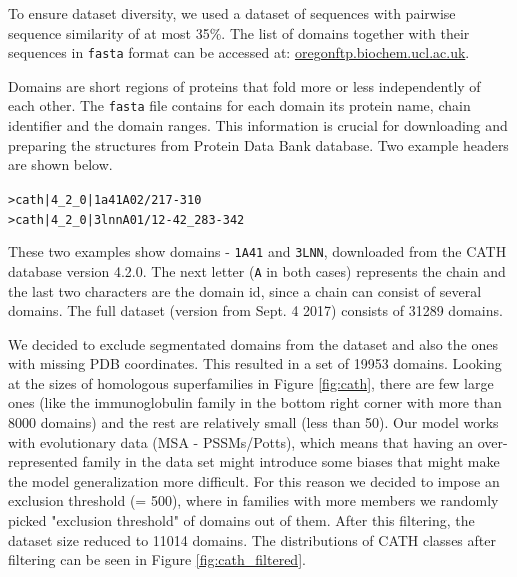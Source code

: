 To ensure dataset diversity, we used a dataset of sequences with pairwise sequence similarity of at most 35\%. 
The list of domains together with their sequences in \texttt{fasta} format can be accessed at: \href{ftp://orengoftp.biochem.ucl.ac.uk/cath/releases/latest-release/sequence-data/cath-domain-seqs-S35.fa}{oregonftp.biochem.ucl.ac.uk}.
    
Domains are short regions of proteins that fold more or less independently of each other. 
The \texttt{fasta} file contains for each domain its protein name, chain identifier and the domain ranges. 
This information is crucial for downloading and preparing the structures from Protein Data Bank database. 
Two example headers are shown below. 
    
\begin{center}
    \texttt{>cath|4\_2\_0|1a41A02/217-310}\\
    \texttt{>cath|4\_2\_0|3lnnA01/12-42\_283-342}
\end{center}
    
These two examples show domains - \texttt{1A41} and \texttt{3LNN}, downloaded from the CATH database version 4.2.0. 
The next letter (\texttt{A} in both cases) represents the chain and the last two characters are the domain id, since a chain can consist of several domains. 
The full dataset (version from Sept. 4 2017) consists of 31289 domains. 
    
We decided to exclude segmentated domains from the dataset and also the ones with missing PDB coordinates. 
This resulted in a set of 19953 domains. 
Looking at the sizes of homologous superfamilies in Figure \ref{fig:cath}, there are few large ones (like the immunoglobulin family in the bottom right corner with more than 8000 domains) and the rest are relatively small (less than 50). 
Our model works with evolutionary data (MSA - PSSMs/Potts), which means that having an over-represented family in the data set might introduce some biases that might make the model generalization more difficult. 
For this reason we decided to impose an exclusion threshold (= 500), where in families with more members we randomly picked "exclusion threshold" of domains out of them. 
After this filtering, the dataset size reduced to 11014 domains.
The distributions of CATH classes after filtering can be seen in Figure \ref{fig:cath_filtered}.
    
